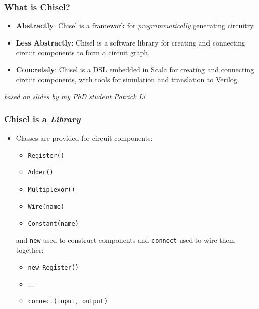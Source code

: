 
\begin{frame}[fragile]
\frametitle{What is Chisel?}
\vfill
\begin{itemize}
\item {\bf Abstractly}: Chisel is a framework for {\it programmatically} generating circuitry.
\item {\bf Less Abstractly}: Chisel is a software library for creating and connecting circuit components to form a circuit graph.
\item {\bf Concretely}: Chisel is a DSL embedded in Scala for creating and connecting circuit components, with tools for simulation and translation to Verilog.
\end{itemize}
\vspace{3.5cm}
{\it\small * based on slides by my PhD student Patrick Li}
\end{frame}

\begin{frame}[fragile]
\frametitle{Chisel is a {\it Library}}
\begin{itemize}
\item Classes are provided for circuit components:
\begin{itemize}
\item \verb+Register()+
\item \verb+Adder()+
\item \verb+Multiplexor()+
\item \verb+Wire(name)+
\item \verb+Constant(name)+
\end{itemize}

\noindent
and \verb+new+ used to construct components and \verb+connect+ used to wire them together:
\begin{itemize}
\item \verb+new Register()+
\item ...
\item \verb+connect(input, output)+
\end{itemize}
\end{itemize}
\end{frame}

